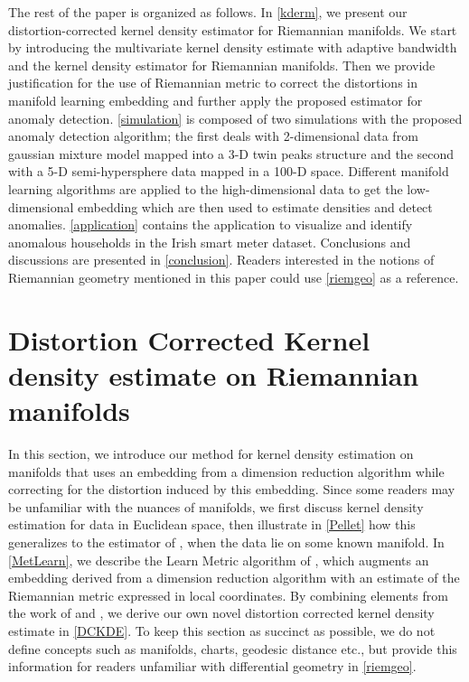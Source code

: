 \documentclass[11pt,a4paper,]{article}
\begin{document}
The rest of the paper is organized as follows. In \autoref{kderm}, we present our distortion-corrected kernel density estimator for Riemannian manifolds. We start by introducing the multivariate kernel density estimate with adaptive bandwidth and the kernel density estimator for Riemannian manifolds. Then we provide justification for the use of Riemannian metric to correct the distortions in manifold learning embedding and further apply the proposed estimator for anomaly detection. \autoref{simulation} is composed of two simulations with the proposed anomaly detection algorithm; the first deals with 2-dimensional data from gaussian mixture model mapped into a 3-D twin peaks structure and the second with a 5-D semi-hypersphere data mapped in a 100-D space. Different manifold learning algorithms are applied to the high-dimensional data to get the low-dimensional embedding which are then used to estimate densities and detect anomalies.
\autoref{application} contains the application to visualize and identify anomalous households in the Irish smart meter dataset. Conclusions and discussions are presented in \autoref{conclusion}. Readers interested in the notions of Riemannian geometry mentioned in this paper could use \autoref{riemgeo} as a reference.

\hypertarget{kderm}{%
\section{Distortion Corrected Kernel density estimate on Riemannian manifolds}\label{kderm}}

In this section, we introduce our method for kernel density estimation on manifolds that uses an embedding from a dimension reduction algorithm while correcting for the distortion induced by this embedding. Since some readers may be unfamiliar with the nuances of manifolds, we first discuss kernel density estimation for data in Euclidean space, then illustrate in \autoref{Pellet} how this generalizes to the estimator of \textcite{Pelletier2005-vu}, when the data lie on some known manifold. In \autoref{MetLearn}, we describe the Learn Metric algorithm of \textcite{Perrault-Joncas2013-pq}, which augments an embedding derived from a dimension reduction algorithm with an estimate of the Riemannian metric expressed in local coordinates. By combining elements from the work of \textcite{Pelletier2005-vu} and \textcite{Perrault-Joncas2013-pq}, we derive our own novel distortion corrected kernel density estimate in \autoref{DCKDE}. To keep this section as succinct as possible, we do not define concepts such as manifolds, charts, geodesic distance etc., but provide this information for readers unfamiliar with differential geometry in \autoref{riemgeo}.
\end{document}
